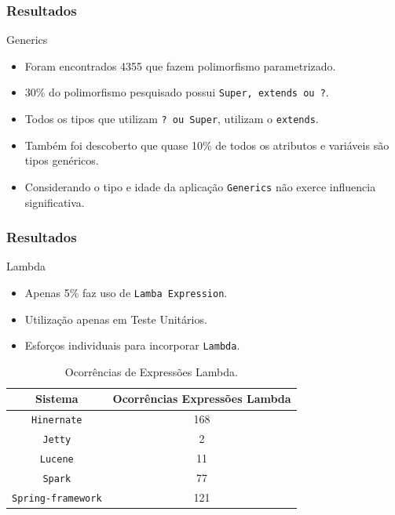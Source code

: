 \documentclass[]{beamer}
\begin{document}
	\begin{frame}[fragile, label=re]\frametitle{Resultados}
		\begin{block}{Generics}
			\begin{itemize}
				\item Foram encontrados 4355 que fazem polimorfismo parametrizado.
				
				\item 30\% do polimorfismo pesquisado possui \texttt{Super, extends ou ?}.
				
				\item Todos os tipos que utilizam \texttt{? ou Super}, utilizam o \texttt{extends}.
				
				
				\item Também foi descoberto que quase 10\% de todos os atributos e variáveis são tipos genéricos.
				
				\item Considerando o tipo e idade da aplicação \texttt{Generics} não exerce influencia significativa.
				
			\end{itemize}
		\end{block}
	\end{frame}	
	

	\begin{frame}[fragile, label=re]\frametitle{Resultados}
		\begin{block}{Lambda}
			\begin{itemize}
				\item Apenas 5\% faz uso de \texttt{Lamba Expression}.
				\item Utilização apenas em Teste Unitários.
				\item Esforços individuais para incorporar \texttt{Lambda}.
			\end{itemize}
		
			\begin{table}[h]\footnotesize
				\centering
				\caption{Ocorrências de Expressões Lambda.}
				\begin{tabular}{cc}
					\hline
					Sistema & Ocorrências Expressões Lambda\\ 
					\hline \hline
					\texttt{Hinernate} & 168 \\ 
					\texttt{Jetty} & 2 \\ 
					\texttt{Lucene} & 11 \\ 
					\texttt{Spark} & 77 \\ 
					\texttt{Spring-framework} & 121 \\ \hline
				\end{tabular}
				\label{tab:adocaoLambda} %
			\end{table}
		\end{block}
	\end{frame}	
	
\end{document}
